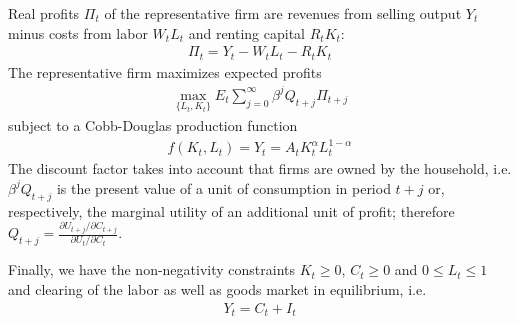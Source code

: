 Real profits $\Pi_t$ of the representative firm are revenues from selling output $Y_t$ minus costs from labor $W_t L_t$ and renting capital $R_t K_t$:
\begin{align*}
    \Pi_t = Y_{t} - W_{t} L_{t} - R_{t} K_{t}
\end{align*}
The representative firm maximizes expected profits
\begin{align*}
    \underset{\{L_{t},K_{t}\}}{\max} E_t \sum_{j=0}^{\infty} \beta^j Q_{t+j}\Pi_{t+j}
\end{align*}
subject to a Cobb-Douglas production function
\begin{align*}
    f(K_t, L_t) = Y_t = A_t K_t^\alpha L_t^{1-\alpha}
\end{align*}
The discount factor takes into account that firms are owned by the household, i.e. $\beta^j Q_{t+j}$ is the present value of a unit of consumption in period $t+j$ or, respectively, the marginal utility of an additional unit of profit; therefore $Q_{t+j}=\frac{\partial U_{t+j}/\partial C_{t+j}}{\partial U_{t}/\partial C_{t}}$.

Finally, we have the non-negativity constraints	$K_t \geq0$, $C_t \geq 0$ and $0\leq L_t \leq 1$ and clearing of the labor as well as goods market in equilibrium, i.e.
\begin{align*}
    Y_t = C_t + I_t
\end{align*}

